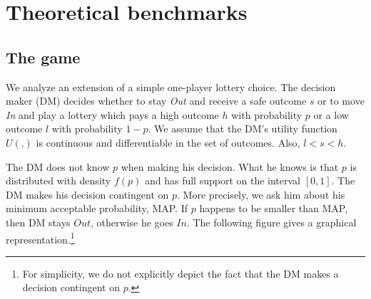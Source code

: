 

%
%
%



\clearpage
\pagebreak



\clearpage
\pagebreak

\appendix
\section{Theoretical benchmarks}
\label{section:appendixa}
\setcounter{figure}{0}
\setcounter{table}{0}
\renewcommand{\thefigure}{A.\arabic{figure}}
\renewcommand{\thetable}{A.\arabic{table}}
\subsection{The game}

We analyze an extension of a simple one-player lottery choice.
The decision maker (DM) decides whether to stay \emph{Out} and receive a safe outcome $s$ or to move \emph{In} and play a lottery which pays a high outcome $h$ with probability $p$ or a low outcome $l$ with probability $1-p$.
We assume that the DM's utility function $U(.)$ is continuous and differentiable in the set of outcomes.
Also, $l < s < h$. 

The DM does not know $p$ when making his decision.
What he knows is that $p$ is distributed with density $f(p)$ and has full support on the interval $[0,1]$.
The DM makes his decision contingent on $p$.
More precisely, we ask him about his minimum acceptable probability, MAP.
If $p$ happens to be smaller than MAP, then DM stays $Out$, otherwise he goes $In$.
The following figure gives a graphical representation.\footnote{
For simplicity, we do not explicitly depict the fact that the DM makes a decision contingent on $p$.
} 

